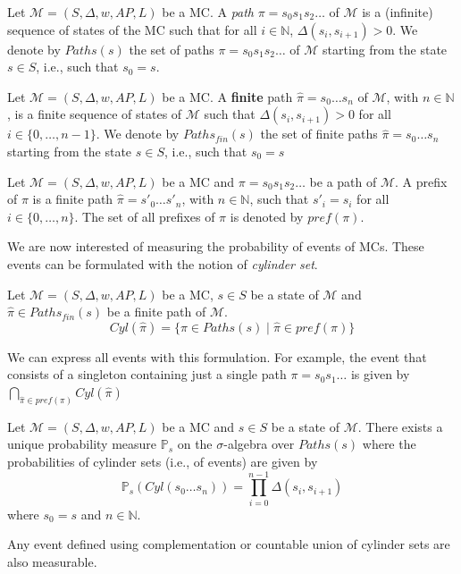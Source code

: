 \begin{definition} Let $\mathcal{M} = (S, \Delta, w, AP, L)$ be a MC.
A \textit{path} $\pi = s_0 s_1 s_2 \dots$ of $\mathcal{M}$ is a (infinite) sequence of states of the MC such that for all $i \in \mathbb{N}$, $\Delta(s_i, s_{i+1})> 0$. We denote by $Paths(s)$ the set of paths $\pi = s_0s_1s_2\dots$ of $\mathcal{M}$ starting from the state $s \in S$, i.e., such that $s_0 = s$.
\end{definition}
\begin{definition}
Let $\mathcal{M} = (S, \Delta, w, AP, L)$ be a MC.
A \textbf{finite} path $\hat{\pi} = s_0 \dots s_n$ of $\mathcal{M}$, with $n \in \mathbb{N}$, is a finite sequence of states of $\mathcal{M}$ such that $\Delta(s_i, s_{i+1}) > 0$ for all $i \in \{0, \dots, n-1\}$.
We denote by $Paths_{fin}(s)$ the set of finite paths $\hat{\pi} = s_0 \dots s_n$ starting from the state $s \in S$, i.e., such that $s_0 = s$
\end{definition}
\begin{definition}
Let $\mathcal{M} = (S, \Delta, w, AP, L)$ be a MC and $\pi = s_0s_1s_2 \dots$ be a path of $\mathcal{M}$. A prefix of $\pi$ is a finite path $\hat{\pi} = s'_0 \dots s'_n$, with $n \in \mathbb{N}$, such that $s'_i = s_i$ for all $i \in \{0, \dots, n\}$.
The set of all prefixes of $\pi$ is denoted by $pref(\pi)$.
\end{definition}

We are now interested of measuring the probability of events of MCs. These events can be formulated with the notion of \textit{cylinder set}.

\begin{definition}
Let $\mathcal{M} = (S, \Delta, w, AP, L)$ be a MC, $s \in S$ be a state of $\mathcal{M}$ and $\hat{\pi} \in Paths_{fin}(s)$ be a finite path of $\mathcal{M}$.
\[Cyl(\hat{\pi})=\{\pi\in Paths(s)\;|\;\hat{\pi}\in pref(\pi) \} \]
\end{definition}

We can express all events with this formulation. For example, the event that consists of a singleton containing just a single path $\pi = s_0s_1\dots$ is given by $\bigcap_{\hat{\pi} \in pref(\pi)} Cyl(\hat{\pi})$

\begin{theorem}\label{theo1}
  Let $\mathcal{M}=(S, \Delta, w, AP, L)$ be a MC and $s \in S$ be a state of $\mathcal{M}$. There exists a unique probability measure $\mathbb{P}_s$ on the
  $\sigma$-algebra over $Paths(s)$ where the probabilities of cylinder sets (i.e., of events) are given by
  \[
    \mathbb{P}_s(Cyl(s_0 \dots s_n)) = \prod_{i = 0}^{n - 1} \Delta(s_i, s_{i+1})
  \]
  where $s_0 = s$ and $n \in \mathbb{N}$.
\end{theorem}
\begin{corollary}
Any event defined using complementation or countable union of cylinder sets are also measurable.
\end{corollary}

